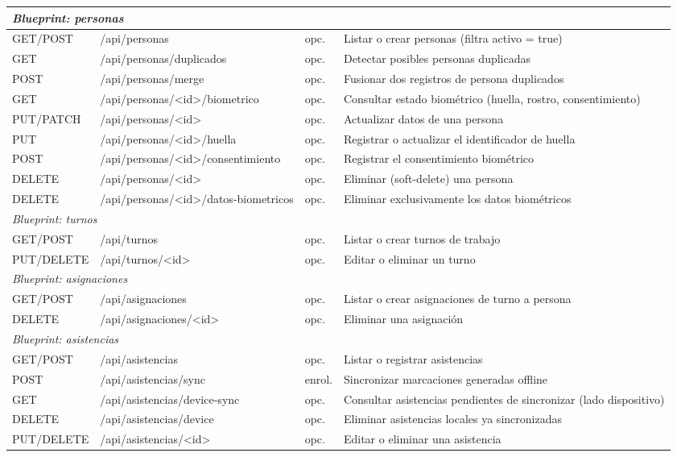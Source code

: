 \documentclass{iccmemoria}
\begin{document}
\begin{longtable}{|p{1.5cm}|p{5.2cm}|p{1.2cm}|p{5.3cm}|}
\multicolumn{4}{|l|}{\textit{Blueprint: personas}} \\
\hline
GET/\allowbreak POST & /api/personas & opc. & Listar o crear personas (filtra activo = true) \\
GET & /api/personas/duplicados & opc. & Detectar posibles personas duplicadas \\
POST & /api/personas/merge & opc. & Fusionar dos registros de persona duplicados \\
GET & /api/\allowbreak personas/\allowbreak <id>/\allowbreak biometrico & opc. & Consultar estado biométrico (huella, rostro, consentimiento) \\
PUT/\allowbreak PATCH & /api/personas/<id> & opc. & Actualizar datos de una persona \\
PUT & /api/personas/<id>/huella & opc. & Registrar o actualizar el identificador de huella \\
POST & /api/\allowbreak personas/\allowbreak <id>/\allowbreak consentimiento & opc. & Registrar el consentimiento biométrico \\
DELETE & /api/personas/<id> & opc. & Eliminar (soft-delete) una persona \\
DELETE & /api/\allowbreak personas/\allowbreak <id>/\allowbreak datos-biometricos & opc. & Eliminar exclusivamente los datos biométricos \\
\hline

\multicolumn{4}{|l|}{\textit{Blueprint: turnos}} \\
\hline
GET/\allowbreak POST & /api/turnos & opc. & Listar o crear turnos de trabajo \\
PUT/\allowbreak DELETE & /api/turnos/<id> & opc. & Editar o eliminar un turno \\
\hline

\multicolumn{4}{|l|}{\textit{Blueprint: asignaciones}} \\
\hline
GET/\allowbreak POST & /api/asignaciones & opc. & Listar o crear asignaciones de turno a persona \\
DELETE & /api/asignaciones/<id> & opc. & Eliminar una asignación \\
\hline

\multicolumn{4}{|l|}{\textit{Blueprint: asistencias}} \\
\hline
GET/\allowbreak POST & /api/asistencias & opc. & Listar o registrar asistencias \\
POST & /api/asistencias/sync & enrol. & Sincronizar marcaciones generadas offline \\
GET & /api/\allowbreak asistencias/\allowbreak device-sync & opc. & Consultar asistencias pendientes de sincronizar (lado dispositivo) \\
DELETE & /api/asistencias/device & opc. & Eliminar asistencias locales ya sincronizadas \\
PUT/\allowbreak DELETE & /api/asistencias/<id> & opc. & Editar o eliminar una asistencia \\
\hline


\end{longtable}
\end{document}
